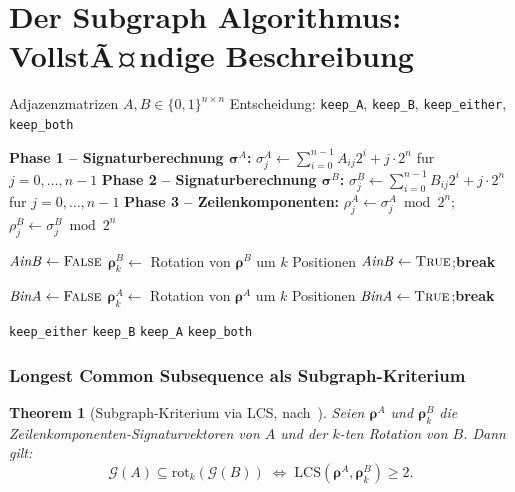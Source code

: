 ﻿\documentclass[12pt, a4paper, titlepage]{report}
\newtheorem{theorem}{Theorem}[section]
\theoremstyle{definition}
\theoremstyle{remark}
\begin{document}
\section{Der Subgraph Algorithmus: VollstÃ¤ndige Beschreibung}

\begin{algorithm}[H]
\caption{Subgraph Algorithmus~\citep{epp2026subgraph}}
\label{alg:subgraph}
\begin{algorithmic}[1]
\Require Adjazenzmatrizen $A, B \in \{0,1\}^{n \times n}$
\Ensure Entscheidung: \texttt{keep\_A}, \texttt{keep\_B}, \texttt{keep\_either}, \texttt{keep\_both}

\State \textbf{Phase 1 -- Signaturberechnung $\bm{\sigma}^A$:}
  $\sigma_j^A \gets \sum_{i=0}^{n-1} A_{ij} 2^i + j \cdot 2^n$ fur $j=0,\ldots,n{-}1$
\State \textbf{Phase 2 -- Signaturberechnung $\bm{\sigma}^B$:}
  $\sigma_j^B \gets \sum_{i=0}^{n-1} B_{ij} 2^i + j \cdot 2^n$ fur $j=0,\ldots,n{-}1$
\State \textbf{Phase 3 -- Zeilenkomponenten:}
  $\rho_j^A \gets \sigma_j^A \bmod 2^n$;\quad $\rho_j^B \gets \sigma_j^B \bmod 2^n$

\State $\mathit{AinB} \gets \textsc{False}$
  \State $\bm{\rho}^B_k \gets$ Rotation von $\bm{\rho}^B$ um $k$ Positionen
    \State $\mathit{AinB} \gets \textsc{True}$;\quad \textbf{break}
  \EndIf
\EndFor

\State $\mathit{BinA} \gets \textsc{False}$
  \State $\bm{\rho}^A_k \gets$ Rotation von $\bm{\rho}^A$ um $k$ Positionen
    \State $\mathit{BinA} \gets \textsc{True}$;\quad \textbf{break}
  \EndIf
\EndFor

 \Return \texttt{keep\_either}
 \Return \texttt{keep\_B}
 \Return \texttt{keep\_A}
\Else{} \Return \texttt{keep\_both}
\EndIf
\end{algorithmic}
\end{algorithm}

\subsubsection{Longest Common Subsequence als Subgraph-Kriterium}

\begin{theorem}[Subgraph-Kriterium via LCS, nach~\citep{epp2026subgraph}]
\label{thm:lcs_kriterium}
Seien $\bm{\rho}^A$ und $\bm{\rho}^B_k$ die Zeilenkomponenten-Signaturvektoren
von $A$ und der $k$-ten Rotation von $B$. Dann gilt:
\begin{equation}
  \mathcal{G}(A) \subseteq \mathrm{rot}_k(\mathcal{G}(B))
  \;\Longleftrightarrow\;
  \mathrm{LCS}(\bm{\rho}^A, \bm{\rho}^B_k) \geq 2.
  \label{eq:lcs_kriterium}
\end{equation}
\end{theorem}
\end{document}
